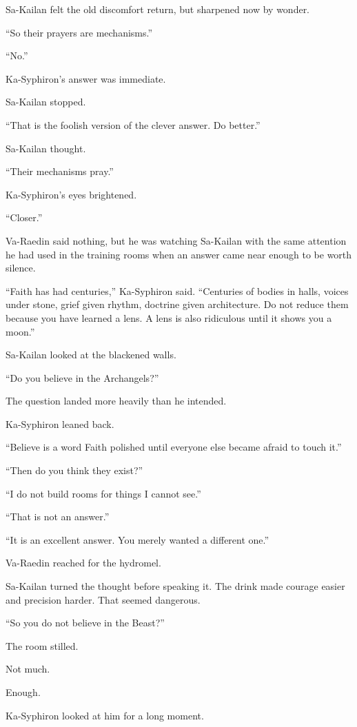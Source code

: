 Sa-Kailan felt the old discomfort return, but sharpened now by wonder.\par
“So their prayers are mechanisms.”\par
“No.”\par
Ka-Syphiron’s answer was immediate.\par
Sa-Kailan stopped.\par
“That is the foolish version of the clever answer. Do better.”\par
Sa-Kailan thought.\par
“Their mechanisms pray.”\par
Ka-Syphiron’s eyes brightened.\par
“Closer.”\par
Va-Raedin said nothing, but he was watching Sa-Kailan with the same attention he had used in the training rooms when an answer came near enough to be worth silence.\par
“Faith has had centuries,” Ka-Syphiron said. “Centuries of bodies in halls, voices under stone, grief given rhythm, doctrine given architecture. Do not reduce them because you have learned a lens. A lens is also ridiculous until it shows you a moon.”\par
Sa-Kailan looked at the blackened walls.\par
“Do you believe in the Archangels?”\par
The question landed more heavily than he intended.\par
Ka-Syphiron leaned back.\par
“Believe is a word Faith polished until everyone else became afraid to touch it.”\par
“Then do you think they exist?”\par
“I do not build rooms for things I cannot see.”\par
“That is not an answer.”\par
“It is an excellent answer. You merely wanted a different one.”\par
Va-Raedin reached for the hydromel.\par
Sa-Kailan turned the thought before speaking it. The drink made courage easier and precision harder. That seemed dangerous.\par
“So you do not believe in the Beast?”\par
The room stilled.\par
Not much.\par
Enough.\par
Ka-Syphiron looked at him for a long moment.\par
